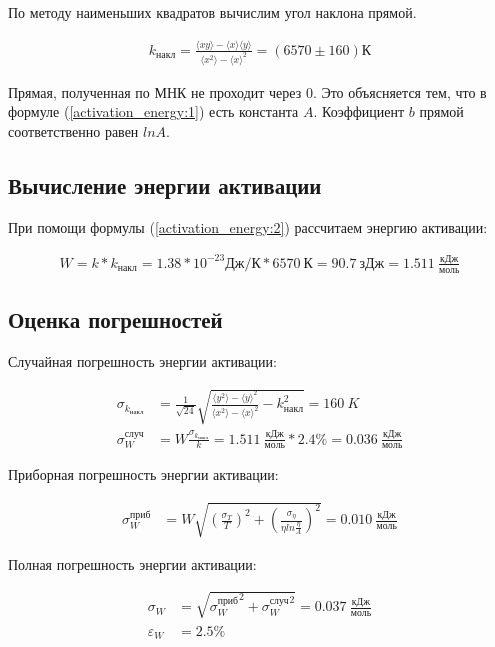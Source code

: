 \documentclass[a4paper, 12pt]{article}
\begin{document}
    По методу наименьших квадратов вычислим угол наклона прямой.

    \begin{align*}
        k_{накл} = \frac{\langle xy \rangle - \langle x \rangle \langle y \rangle}{\langle x^2 \rangle - \langle x \rangle^2} = (6570 \pm 160) К
    \end{align*}

    Прямая, полученная по МНК не проходит через 0. Это объясняется тем, что в формуле (\ref{activation_energy:1}) есть константа $A$. Коэффициент $b$ прямой соответственно равен $lnA$.

    \subsection{Вычисление энергии активации}

    При помощи формулы (\ref{activation_energy:2}) рассчитаем энергию активации:

    \begin{align*}
        W = k * k_{накл} = 1.38 * 10^{-23} Дж/К * 6570~К = 90.7~зДж = 1.511~\frac{кДж}{моль}
    \end{align*}

    \subsection{Оценка погрешностей}

    Случайная погрешность энергии активации:

    \begin{align*}
        \sigma_{k_{накл}} &= \frac{1}{\sqrt{24}} \sqrt{\frac{\langle y^2 \rangle - {\langle y \rangle}^2}{\langle x^2 \rangle - {\langle x \rangle}^2} - k_{накл}^2} = 160~K\\
        \sigma_W^{случ} &= W \frac{\sigma_{k_{накл}}}{k} = 1.511~\frac{кДж}{моль} * 2.4\% = 0.036~\frac{кДж}{моль}
    \end{align*}

    Приборная погрешность энергии активации:

    \begin{align*}
        \sigma_W^{приб} &= W \sqrt{\left( \frac{\sigma_T}{T} \right)^2 + \left( \frac{\sigma_{\eta}}{\eta ln \frac{\eta}{A}} \right)^2} = 0.010~\frac{кДж}{моль}
    \end{align*}

    Полная погрешность энергии активации:

    \begin{align*}
        \sigma_W &= \sqrt{{\sigma_W^{приб}}^2 + {\sigma_W^{случ}}^2} = 0.037~\frac{кДж}{моль}\\
        \varepsilon_W &= 2.5\%
    \end{align*}
\end{document}
